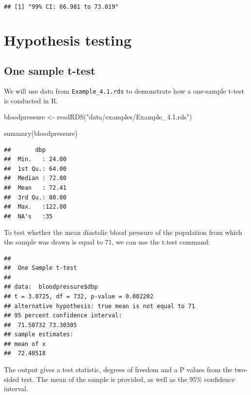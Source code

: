 \documentclass[
]{memoir}
\newenvironment{Shaded}{\begin{snugshade}}{\end{snugshade}}
\newcommand{\AttributeTok}[1]{\textcolor[rgb]{0.77,0.63,0.00}{#1}}
\newcommand{\DecValTok}[1]{\textcolor[rgb]{0.00,0.00,0.81}{#1}}
\newcommand{\FunctionTok}[1]{\textcolor[rgb]{0.00,0.00,0.00}{#1}}
\newcommand{\NormalTok}[1]{#1}
\newcommand{\OtherTok}[1]{\textcolor[rgb]{0.56,0.35,0.01}{#1}}
\newcommand{\SpecialCharTok}[1]{\textcolor[rgb]{0.00,0.00,0.00}{#1}}
\newcommand{\StringTok}[1]{\textcolor[rgb]{0.31,0.60,0.02}{#1}}
\begin{document}
\begin{verbatim}
## [1] "99% CI: 66.981 to 73.019"
\end{verbatim}

\hypertarget{hypothesis-testing}{%
\chapter{Hypothesis testing}\label{hypothesis-testing}}

\hypertarget{one-sample-t-test}{%
\section{One sample t-test}\label{one-sample-t-test}}

We will use data from \texttt{Example\_4.1.rds} to demonstrate how a one-sample t-test is conducted in R.

\begin{Shaded}
\begin{Highlighting}[]
\NormalTok{bloodpressure }\OtherTok{\textless{}{-}} \FunctionTok{readRDS}\NormalTok{(}\StringTok{"data/examples/Example\_4.1.rds"}\NormalTok{)}

\FunctionTok{summary}\NormalTok{(bloodpressure)}
\end{Highlighting}
\end{Shaded}

\begin{verbatim}
##       dbp        
##  Min.   : 24.00  
##  1st Qu.: 64.00  
##  Median : 72.00  
##  Mean   : 72.41  
##  3rd Qu.: 80.00  
##  Max.   :122.00  
##  NA's   :35
\end{verbatim}

To test whether the mean diastolic blood pressure of the population from which the sample was drawn is equal to 71, we can use the t.test command:

\begin{Shaded}
\end{Shaded}

\begin{verbatim}
## 
##  One Sample t-test
## 
## data:  bloodpressure$dbp
## t = 3.0725, df = 732, p-value = 0.002202
## alternative hypothesis: true mean is not equal to 71
## 95 percent confidence interval:
##  71.50732 73.30305
## sample estimates:
## mean of x 
##  72.40518
\end{verbatim}

The output gives a test statistic, degrees of freedom and a P values from the two-sided test. The mean of the sample is provided, as well as the 95\% confidence interval.

  
\end{document}
